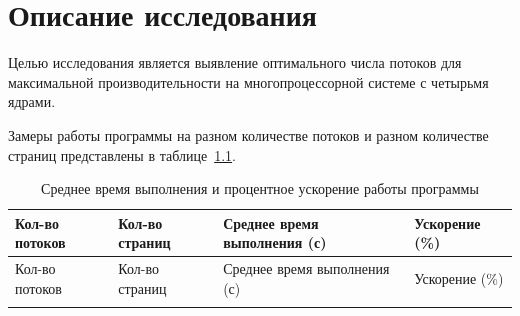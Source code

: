 \vspace{20mm}
\chapter{Описание исследования}
Целью исследования является выявление оптимального числа потоков для максимальной производительности на многопроцессорной системе с четырьмя ядрами.

Замеры работы программы на разном количестве потоков и разном количестве страниц представлены в таблице~\ref{tbl:perf_tests}.

\begin{longtable}{|p{3.5cm}|p{3.5cm}|p{5cm}|p{3cm}|}
\caption{Среднее время выполнения и процентное ускорение работы программы} \label{tbl:perf_tests} \\ 
\hline
Кол-во потоков & Кол-во страниц & Среднее время выполнения (с) & Ускорение (\%) \\ 
\hline
\endfirsthead

\hline
Кол-во потоков & Кол-во страниц & Среднее время выполнения (с) & Ускорение (\%) \\ 
\hline
\endhead

\hline
\endfoot

\endlastfoot


\end{longtable}
